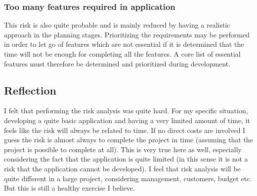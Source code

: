 \documentclass[12pt, letterpaper]{article}
\begin{document}
\subsubsection{Too many features required in application}
This risk is also quite probable and is mainly reduced by having a realistic approach in the planning stages. Prioritizing the requirements may be performed in order to let go of features which are not essential if it is determined that the time will not be enough for completing all the features. A core list of essential features must therefore be determined and prioritized during development. 
\subsection{Reflection}
I felt that performing the risk analysis was quite hard. For my specific situation, developing a quite basic application and having a very limited amount of time, it feels like the risk will always be related to time. If no direct costs are involved I guess the risk is almost always to complete the project in time (assuming that the project is possible to complete at all). This is very true here as well, especially considering the fact that the application is quite limited (in this sense it is not a risk that the application cannot be developed). I feel that risk analysis will be quite different in a large project, considering management, customers, budget etc. But this is still a healthy exercise I believe.
\end{document}
